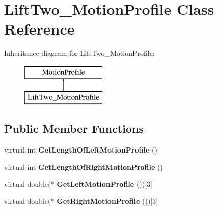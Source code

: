 \hypertarget{class_lift_two___motion_profile}{}\section{Lift\+Two\+\_\+\+Motion\+Profile Class Reference}
\label{class_lift_two___motion_profile}
Inheritance diagram for Lift\+Two\+\_\+\+Motion\+Profile\+:\begin{figure}[H]
\begin{center}
\leavevmode
\includegraphics[height=2.000000cm]{class_lift_two___motion_profile}
\end{center}
\end{figure}
\subsection*{Public Member Functions}
\begin{DoxyCompactItemize}
\item 
\mbox{\label{class_lift_two___motion_profile_a4d35a32fe4f2fa5680b524997f8a4bb3}} 
virtual int {\bfseries Get\+Length\+Of\+Left\+Motion\+Profile} ()
\item 
\mbox{\label{class_lift_two___motion_profile_af7766868c73229c5697ab43fe7b54332}} 
virtual int {\bfseries Get\+Length\+Of\+Right\+Motion\+Profile} ()
\item 
\mbox{\label{class_lift_two___motion_profile_a28ca86c6fe0f9221f3fb5c8712f048e9}} 
virtual double($\ast$ {\bfseries Get\+Left\+Motion\+Profile} ())\mbox{[}3\mbox{]}
\item 
\mbox{\label{class_lift_two___motion_profile_a7d2ccce0ea921859c1954e16a78244e0}} 
virtual double($\ast$ {\bfseries Get\+Right\+Motion\+Profile} ())\mbox{[}3\mbox{]}
\end{DoxyCompactItemize}
